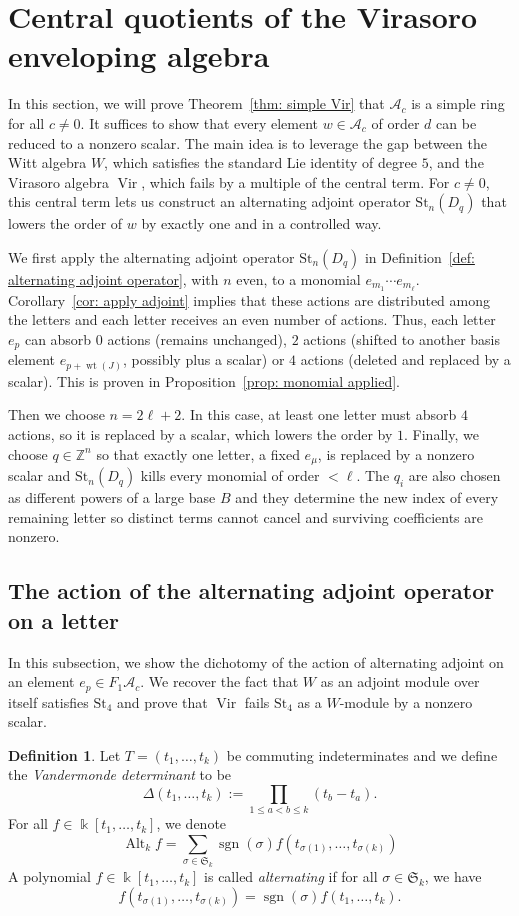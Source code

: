 \documentclass[12pt]{amsart}
\theoremstyle{plain}
\theoremstyle{definition}
\newtheorem{definition}[theorem]{Definition}
\numberwithin{equation}{theorem}
\newcommand{\kk}{\Bbbk}
\newcommand{\Vir}{\operatorname{Vir}}
\newcommand{\Sg}{\mathfrak S}
\newcommand{\sgn}{\operatorname{sgn}}
\newcommand{\Alt}{\operatorname{Alt}}
\newcommand{\ZZ}{\mathbb{Z}}
\newcommand{\calA}{\mathcal A}
\newcommand{\St}{\mathrm{St}}
\newcommand{\wt}{\operatorname{wt}}
\begin{document}
\section{Central quotients of the Virasoro enveloping algebra}\label{sec: vir}
In this section, we will prove Theorem~\ref{thm: simple Vir} that $\calA_c$ is a simple ring for all $c \neq 0$. It suffices to show that every element $w \in \calA_c$ of order $d$ can be reduced to a nonzero scalar. The main idea is to leverage the gap between the Witt algebra $W$, which satisfies the standard Lie identity of degree $5$, and the Virasoro algebra $\Vir$, which fails by a multiple of the central term. For $c \neq 0$, this central term lets us construct an alternating adjoint operator $\St_n(D_q)$ that lowers the order of $w$ by exactly one and in a controlled way.

We first apply the alternating adjoint operator $\St_n(D_q)$ in Definition~\ref{def: alternating adjoint operator}, with $n$ even, to a monomial $e_{m_1} \cdots e_{m_\ell}$. Corollary~\ref{cor: apply adjoint} implies that these actions are distributed among the letters and each letter receives an even number of actions. Thus, each letter $e_p$ can absorb $0$ actions (remains unchanged), $2$ actions (shifted to another basis element $e_{p+ \wt(J)}$, possibly plus a scalar) or $4$ actions (deleted and replaced by a scalar). This is proven in Proposition~\ref{prop: monomial applied}.

Then we choose $n = 2\ell+2$. In this case, at least one letter must absorb $4$ actions, so it is replaced by a scalar, which lowers the order by $1$. Finally, we choose $q \in \ZZ^n$ so that exactly one letter, a fixed $e_\mu$, is replaced by a nonzero scalar and $\St_n(D_q)$ kills every monomial of order $<\ell$. The $q_i$ are also chosen as different powers of a large base $B$ and they determine the new index of every remaining letter so distinct terms cannot cancel and surviving coefficients are nonzero.
\subsection{The action of the alternating adjoint operator on a letter}
In this subsection, we show the dichotomy of the action of alternating adjoint on an element $e_p \in F_1 \calA_c$. We recover the fact that $W$ as an adjoint module over itself satisfies $\St_4$ and prove that $\Vir$ fails $\St_4$ as a $W$-module by a nonzero scalar. 

\begin{definition}  
    Let $T = (t_1, \dots, t_k)$ be commuting indeterminates and we define the \emph{Vandermonde determinant} to be 
    \begin{equation}\label{eq: vandermonde}
    \Delta (t_1, \dots, t_k) := \prod_{1 \leq a < b \leq k} (t_b-t_a).
    \end{equation}
    For all $f \in \kk[t_1, \dots, t_k]$, we denote 
    \[\Alt_k f = \sum_{\sigma \in \Sg_k} \sgn(\sigma) f(t_{\sigma(1)}, \dots, t_{\sigma(k)})\]
    A polynomial  $f \in \kk[t_1, \dots, t_k]$ is called \emph{alternating} if for all $\sigma \in \Sg_k$, we have 
    \[f(t_{\sigma(1)}, \dots, t_{\sigma(k)}) = \sgn(\sigma) f(t_1, \dots, t_k).\]
\end{definition}
\end{document}
